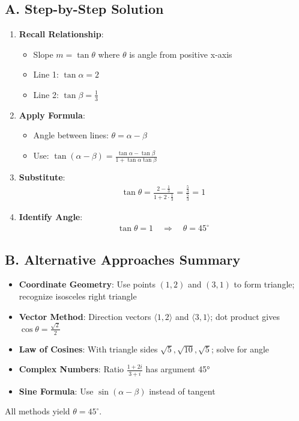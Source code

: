 \documentclass[12pt]{article}
\begin{document}
\begin{solutionbox}
\subsection*{A. Step-by-Step Solution}
\begin{enumerate}[leftmargin=*]
    \item \textbf{Recall Relationship}: 
    \begin{itemize}
        \item Slope $m = \tan\theta$ where $\theta$ is angle from positive x-axis
        \item Line 1: $\tan\alpha = 2$
        \item Line 2: $\tan\beta = \frac{1}{3}$
    \end{itemize}
    
    \item \textbf{Apply Formula}: 
    \begin{itemize}
        \item Angle between lines: $\theta = \alpha - \beta$
        \item Use: $\tan(\alpha - \beta) = \frac{\tan\alpha - \tan\beta}{1 + \tan\alpha\tan\beta}$
    \end{itemize}
    
    \item \textbf{Substitute}: 
    \begin{align*}
    \tan\theta = \frac{2 - \frac{1}{3}}{1 + 2 \cdot \frac{1}{3}} = \frac{\frac{5}{3}}{\frac{5}{3}} = 1
    \end{align*}
    
    \item \textbf{Identify Angle}: 
    \begin{align*}
    \tan\theta = 1 \quad \Rightarrow \quad \theta = 45^\circ
    \end{align*}
\end{enumerate}

\subsection*{B. Alternative Approaches Summary}
\begin{itemize}[leftmargin=*]
    \item \textbf{Coordinate Geometry}: Use points $(1,2)$ and $(3,1)$ to form triangle; recognize isosceles right triangle
    \item \textbf{Vector Method}: Direction vectors $\langle 1,2\rangle$ and $\langle 3,1\rangle$; dot product gives $\cos\theta = \frac{\sqrt{2}}{2}$
    \item \textbf{Law of Cosines}: With triangle sides $\sqrt{5}, \sqrt{10}, \sqrt{5}$; solve for angle
    \item \textbf{Complex Numbers}: Ratio $\frac{1+2i}{3+i}$ has argument 45°
    \item \textbf{Sine Formula}: Use $\sin(\alpha-\beta)$ instead of tangent
\end{itemize}

All methods yield $\theta = 45^\circ$.
\end{solutionbox}
\end{document}
